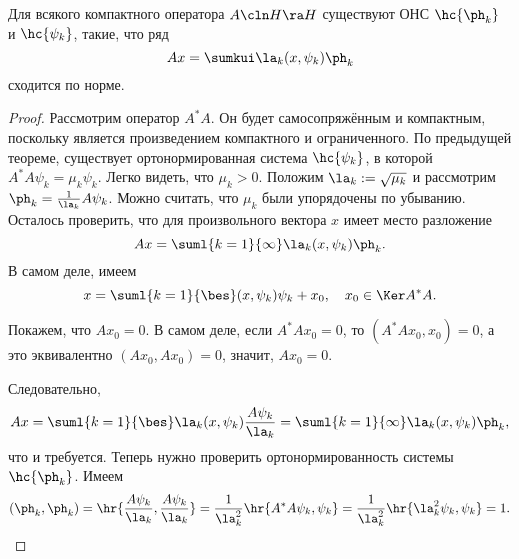 \documentclass[a4paper]{article}
\begin{document}
\begin{imp}
Для всякого компактного оператора $A\cln H \ra H$ существуют ОНС
$\hc{\ph_k}$ и $\hc{\psi_k}$, такие, что ряд
$$Ax = \sumkui \la_k (x,\psi_k)\ph_k$$
сходится по норме.
\end{imp}
\begin{proof}
Рассмотрим оператор $A^*A$. Он будет самосопряжённым и компактным, поскольку является произведением
компактного и ограниченного. По предыдущей теореме, существует
ортонормированная система $\hc{\psi_k}$, в которой $A^*A\psi_k = \mu_k\psi_k$.
Легко видеть, что $\mu_k > 0$.
Положим $\la_k := \sqrt{\mu_k}$ и рассмотрим $\ph_k = \frac{1}{\la_k}A\psi_k$.
Можно считать, что $\mu_k$ были упорядочены по убыванию. Осталось проверить, что
для произвольного вектора $x$ имеет место разложение
$$Ax = \suml{k=1}{\infty} \la_k(x,\psi_k)\ph_k.$$
В самом деле, имеем
$$x = \suml{k=1}{\bes}(x,\psi_k)\psi_k + x_0, \quad x_0 \in \Ker A^*A.$$

Покажем, что $Ax_0 = 0$. В самом деле, если $A^*Ax_0 = 0$,
то $(A^*Ax_0,x_0) = 0$, а это эквивалентно $(Ax_0, Ax_0) = 0$, значит, $Ax_0 = 0$.

Следовательно,
$$Ax = \suml{k=1}{\bes}\la_k(x,\psi_k)\frac{A\psi_k}{\la_k} = \suml{k=1}{\infty}\la_k(x,\psi_k)\ph_k,$$
что и требуется. Теперь нужно проверить ортонормированность системы $\hc{\ph_k}$. Имеем
$$(\ph_k, \ph_k) = \hr{\frac{A\psi_k}{\la_k}, \frac{A\psi_k}{\la_k}}
=\frac{1}{\la_k^2}\hr{A^*A\psi_k, \psi_k} = \frac{1}{\la_k^2}\hr{\la_k^2\psi_k, \psi_k} = 1.$$
\hfill\end{proof}
\end{document}
